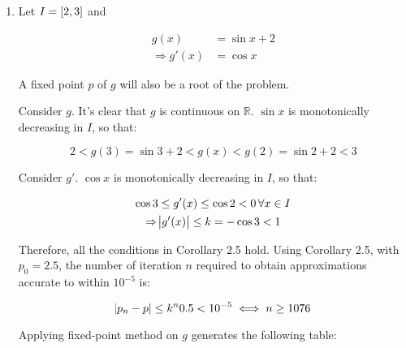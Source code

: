 \documentclass[../../../../Assignments]{subfiles}
\begin{document}
\begin{solution}
    \begin{enumerate}[label = \alph*)]
        \item Let \(I = \interval{2}{3}\) and

            \[\begin{aligned}
                             g(x) &= \sin{x} + 2 \\
                \Rightarrow g'(x) &= \cos{x}
            \end{aligned}\]

            A fixed point \(p\) of \(g\) will also be a root of the problem.

            Consider \(g\). It's clear that \(g\) is continuous on
            \(\mathbb{R}\). \(\sin{x}\) is monotonically decreasing in \(I\), so
            that:

            \[2 < g(3) = \sin{3} + 2 < g(x) < g(2) = \sin{2} + 2 < 3\]

            Consider \(g'\). \(\cos{x}\) is monotonically decreasing in \(I\),
            so that:

            \begin{gather*}
                \cos{3} \leq g'(x) \leq \cos{2} < 0 \, \forall x \in I \\
                \Rightarrow \abs{g'(x)} \leq k = - \cos{3} < 1
            \end{gather*}

            Therefore, all the conditions in Corollary 2.5 hold. Using Corollary
            2.5, with \(p_0 = \num{2.5}\), the number of iteration \(n\)
            required to obtain approximations accurate to within \(10^{-5}\) is:

            \[\abs{p_n - p} \leq k^n \num{0.5} < 10^{-5} \iff n \geq 1076\]

            Applying fixed-point method on \(g\) generates the following table:


\end{enumerate}
\end{solution}
\end{document}
